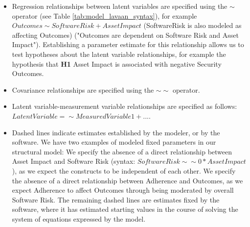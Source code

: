 \begin{itemize}
\item Regression relationships between latent variables are specified using the $\sim$  operator (see Table \ref{tab:model_lavaan_syntax}), for example $Outcomes \sim SoftwareRisk + AssetImpact$ (SoftwareRisk is also modeled as affecting Outcomes) ("Outcomes are dependent on Software Risk and Asset Impact"). Establishing a parameter estimate for this relationship allows us to test hypotheses about the latent variable relationships, for example the hypothesis that \textbf{H1} Asset Impact is associated with negative Security Outcomes.
 \item Covariance relationships are specified using the $\sim\sim$ operator.
\item Latent variable-measurement variable relationships are specified as follows: $LatentVariable =\sim MeasuredVariable1 + ...$. 
\item Dashed lines indicate estimates established by the modeler, or by the software. We have two examples of modeled fixed parameters in our structural model: We specify the absence of a direct relationship between Asset Impact and Software Risk (syntax: $SoftwareRisk \sim\sim 0*AssetImpact$), as we expect the constructs to be independent of each other. We specify the absence of a direct relationship between Adherence and Outcomes, as we expect Adherence to affect Outcomes through being moderated by overall Software Risk. The remaining dashed lines are estimates fixed by the software, where it has estimated starting values in the course of solving the system of equations expressed by the model.
\end{itemize}

